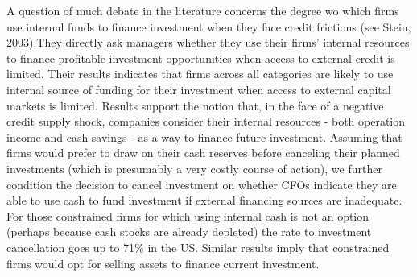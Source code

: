 \documentclass{article}
\begin{document}
{A question of much debate in the literature concerns the degree wo which firms use internal funds to finance investment when they face credit frictions (see Stein, 2003).They directly ask managers whether they use their firms' internal resources to finance profitable investment opportunities when access to external credit is limited. Their results indicates that firms across all categories are likely to use internal source of funding for their investment when access to external capital markets is limited. Results support the notion that, in the face of a negative credit supply shock, companies consider their internal resources - both operation income and cash savings - as a way to finance future investment. Assuming that firms would prefer to draw on their cash reserves before canceling their planned investments (which is presumably a very costly course of action), we further condition the decision to cancel investment on whether CFOs indicate they are able to use cash to fund investment if external financing sources are inadequate. For those constrained firms for which using internal cash is not an option (perhaps because cash stocks are already depleted) the rate to investment cancellation goes up to 71\% in the US. Similar results imply that constrained firms would opt for selling assets to finance current investment. 

}
\end{document}
